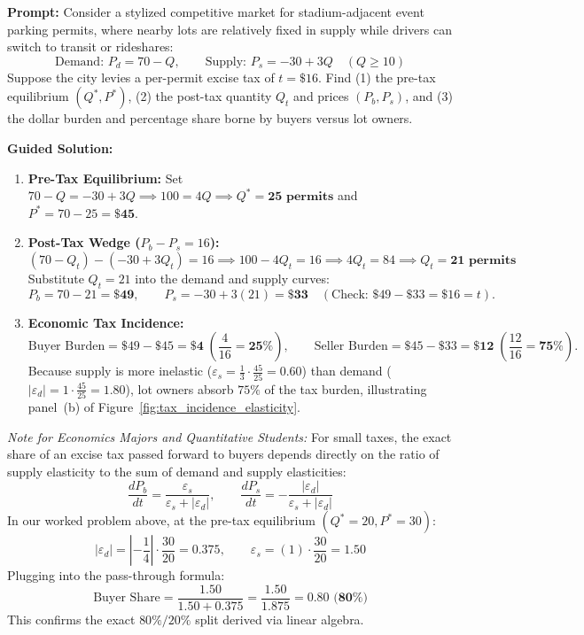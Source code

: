 \documentclass[11pt,letterpaper]{article}
\begin{document}
\begin{tcolorbox}[colback=CourseTeal!8!white,colframe=CourseTeal,title=\textbf{Work It Out: Tax Incidence When Supply Is Inelastic}]
\textbf{Prompt:} Consider a stylized competitive market for stadium-adjacent event parking permits, where nearby lots are relatively fixed in supply while drivers can switch to transit or rideshares:
\[
\text{Demand: } P_d = 70 - Q, \qquad \text{Supply: } P_s = -30 + 3Q \quad (Q \ge 10)
\]
Suppose the city levies a per-permit excise tax of $t = \$16$. Find (1) the pre-tax equilibrium $(Q^*, P^*)$, (2) the post-tax quantity $Q_t$ and prices $(P_b, P_s)$, and (3) the dollar burden and percentage share borne by buyers versus lot owners.

\textbf{Guided Solution:}
\begin{enumerate}
    \item \textbf{Pre-Tax Equilibrium:} Set $70 - Q = -30 + 3Q \implies 100 = 4Q \implies Q^* = \mathbf{25\text{ permits}}$ and $P^* = 70 - 25 = \mathbf{\$45}$.
    \item \textbf{Post-Tax Wedge ($P_b - P_s = 16$):}
    \[
    (70 - Q_t) - (-30 + 3Q_t) = 16 \implies 100 - 4Q_t = 16 \implies 4Q_t = 84 \implies Q_t = \mathbf{21\text{ permits}}
    \]
    Substitute $Q_t = 21$ into the demand and supply curves:
    \[
    P_b = 70 - 21 = \mathbf{\$49}, \qquad P_s = -30 + 3(21) = \mathbf{\$33} \quad (\text{Check: } \$49 - \$33 = \$16 = t).
    \]
    \item \textbf{Economic Tax Incidence:}
    \[
    \text{Buyer Burden} = \$49 - \$45 = \mathbf{\$4} \;\left(\frac{4}{16} = \mathbf{25\%}\right), \qquad \text{Seller Burden} = \$45 - \$33 = \mathbf{\$12} \;\left(\frac{12}{16} = \mathbf{75\%}\right).
    \]
    Because supply is more inelastic ($\varepsilon_s = \frac{1}{3} \cdot \frac{45}{25} = 0.60$) than demand ($|\varepsilon_d| = 1 \cdot \frac{45}{25} = 1.80$), lot owners absorb $75\%$ of the tax burden, illustrating panel~(b) of Figure~\ref{fig:tax_incidence_elasticity}.
\end{enumerate}
\end{tcolorbox}

\begin{tcolorbox}[colback=CoursePurple!8!white,colframe=CoursePurple,title=\textbf{Optional Advanced Section: The Elasticity Tax-Pass-Through Formula}]
\small
\emph{Note for Economics Majors and Quantitative Students:}
For small taxes, the exact share of an excise tax passed forward to buyers depends directly on the ratio of supply elasticity to the sum of demand and supply elasticities:
\[
\frac{dP_b}{dt} = \frac{\varepsilon_s}{\varepsilon_s + |\varepsilon_d|}, \qquad \frac{dP_s}{dt} = -\frac{|\varepsilon_d|}{\varepsilon_s + |\varepsilon_d|}
\]
In our worked problem above, at the pre-tax equilibrium $(Q^*=20, P^*=30)$:
\[
|\varepsilon_d| = \left|-\frac{1}{4}\right| \cdot \frac{30}{20} = 0.375, \qquad \varepsilon_s = (1) \cdot \frac{30}{20} = 1.50
\]
Plugging into the pass-through formula:
\[
\text{Buyer Share} = \frac{1.50}{1.50 + 0.375} = \frac{1.50}{1.875} = \mathbf{0.80 \text{ (80\%)}}
\]
This confirms the exact $80\% / 20\%$ split derived via linear algebra.
\end{tcolorbox}
\end{document}
